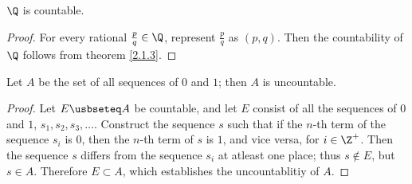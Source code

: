 \begin{corollary}
    $\Q$ is countable.
\end{corollary}
\begin{proof}
    For every rational $\frac{p}{q} \in \Q$, represent $\frac{p}{q}$ as $(p,q)$. Then
    the countability of $\Q$ follows from theorem \ref{2.1.3}.
\end{proof}

\begin{theorem}\label{2.1.4}
    Let $A$ be the set of all sequences of $0$ and  $1$; then  $A$ is uncountable.
\end{theorem}
\begin{proof}
    Let $E \usbseteq A$ be countable, and let $E$ consist of all the sequences  of $0$ and
    $1$,  $s_1,s_2,s_3, \dots$. Construct the sequence $s$ such that if the  $n$-th term of
    the sequence  $s_i$ is  $0$, then the  $n$-th term of  $s$ is  $1$, and vice versa,
    for $i \in \Z^+$. Then the sequence  $s$ differs from the sequence  $s_i$ at atleast
    one place; thus  $s \notin E$, but  $s \in A$. Therefore  $E \subset A$, which establishes
    the uncountablitiy of $A$.
\end{proof}
